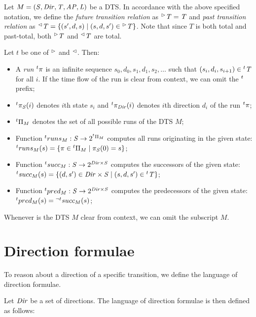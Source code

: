 Let $M = (\mathit{S}, \mathit{Dir}, \mathit{T}, \mathit{AP}, \mathit{L})$ be a \ac{DTS}. In accordance with the above specified notation, we define the \emph{future transition relation} as ${}^\vartriangleright\mathit{T} = \mathit{T}$ and \emph{past transition relation} as ${}^\vartriangleleft\mathit{T} = \{ (s', d, s) \mid (s, d, s') \in {}^\vartriangleright{\mathit{T}} \}$. Note that since $T$ is both total and past-total, both ${}^\vartriangleright\mathit{T}$ and ${}^\vartriangleleft\mathit{T}$ are total.

Let $t$ be one of ${}^\vartriangleright{}$ and ${}^\vartriangleleft{}$. Then:

\begin{itemize}
	\item A \emph{run} ${}^{t}\pi$ is an infinite sequence $s_0, d_0, s_1, d_1, s_2, \ldots$ such that $(s_i, d_{i}, s_{i+1}) \in {}^{t}\mathit{T}$ for all $i$. If the time flow of the run is clear from context, we can omit the ${}^{t}$ prefix;
	\item ${}^{t}\pi_{\mathit{S}}(i)$ denotes $i$th state $s_i$ and ${}^{t}\pi_{\mathit{Dir}}(i)$ denotes $i$th direction $d_i$ of the run ${}^{t}\pi$;
	\item ${}^{t}\Pi_M$ denotes the set of all possible runs of the \ac{DTS} $M$;
	\item Function ${}^{t}runs_M : \mathit{S} \rightarrow 2^{{}^{t}\Pi_M}$ computes all runs originating in the given state: ${}^{t}runs_M(s) = \{ \pi \in {}^{t}\Pi_M \mid \pi_{\mathit{S}}(0) = s\}$;
	\item Function ${}^{t}succ_M : \mathit{S} \rightarrow 2^{\mathit{Dir} \times \mathit{S}}$ computes the successors of the given state:
	${}^{t}succ_M(s) = \{ (d, s') \in \mathit{Dir} \times \mathit{S} \mid (s,d,s') \in {}^{t} \mathit{T} \}$;
	\item Function ${}^{t}pred_M : \mathit{S} \rightarrow 2^{\mathit{Dir} \times \mathit{S}}$ computes the predecessors of the given state:
	${}^{t}pred_M(s) = {}^{\neg t}succ_M(s)$;
\end{itemize}

Whenever is the \ac{DTS} $M$ clear from context, we can omit the subscript $M$.

\section{Direction formulae}

To reason about a direction of a specific transition, we define the language of direction formulae.

Let $\mathit{Dir}$ be a set of directions. The language of direction formulae is then defined as follows:

